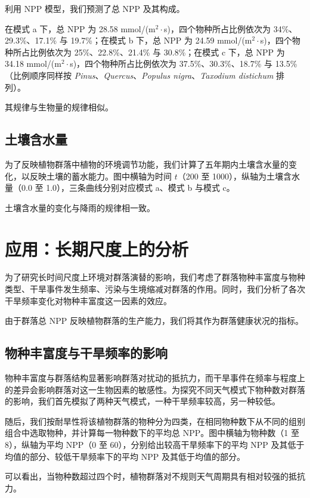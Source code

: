 \documentclass[11pt,a4paper]{ctexart}
\begin{document}
利用 NPP 模型，我们预测了总 NPP 及其构成。

在模式 a 下，总 NPP 为 28.58 mmol/(m$^2\cdot$s)，四个物种所占比例依次为 34\%、29.3\%、17.1\% 与 19.7\%；在模式 b 下，总 NPP 为 24.59 mmol/(m$^2\cdot$s)，四个物种所占比例依次为 25\%、22.8\%、21.4\% 与 30.8\%；在模式 c 下，总 NPP 为 34.18 mmol/(m$^2\cdot$s)，四个物种所占比例依次为 37.5\%、30.3\%、18.7\% 与 13.5\%（比例顺序同样按 \textit{Pinus}、\textit{Quercus}、\textit{Populus nigra}、\textit{Taxodium distichum} 排列）。

其规律与生物量的规律相似。

\subsection{土壤含水量}

为了反映植物群落中植物的环境调节功能，我们计算了五年期内土壤含水量的变化，以反映土壤的蓄水能力。图中横轴为时间 $t$（200 至 1000），纵轴为土壤含水量（0.0 至 1.0），三条曲线分别对应模式 a、模式 b 与模式 c。

土壤含水量的变化与降雨的规律相一致。

\section{应用：长期尺度上的分析}

为了研究长时间尺度上环境对群落演替的影响，我们考虑了群落物种丰富度与物种类型、干旱事件发生频率、污染与生境缩减对群落的作用。同时，我们分析了各次干旱频率变化对物种丰富度这一因素的效应。

由于群落总 NPP 反映植物群落的生产能力，我们将其作为群落健康状况的指标。

\subsection{物种丰富度与干旱频率的影响}

物种丰富度与群落结构显著影响群落对扰动的抵抗力，而干旱事件在频率与程度上的差异会影响群落对这一生物因素的敏感性。为探究不同天气模式下物种数对群落的影响，我们首先模拟了两种天气模式，一种干旱频率较高，另一种较低。

随后，我们按耐旱性将该植物群落的物种分为四类，在相同物种数下从不同的组别组合中选取物种，并计算每一物种数下的平均总 NPP。图中横轴为物种数（1 至 8），纵轴为平均 NPP（0 至 60），分别给出较高干旱频率下的平均 NPP 及其低于均值的部分、较低干旱频率下的平均 NPP 及其低于均值的部分。

可以看出，当物种数超过四个时，植物群落对不规则天气周期具有相对较强的抵抗力。
\end{document}

